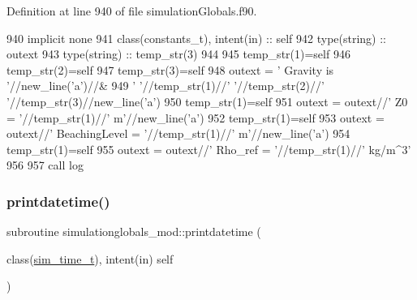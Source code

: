 Definition at line 940 of file simulation\+Globals.\+f90.


\begin{DoxyCode}
940     \textcolor{keywordtype}{implicit none}
941     \textcolor{keywordtype}{class}(constants\_t), \textcolor{keywordtype}{intent(in)} :: self
942     \textcolor{keywordtype}{type}(string) :: outext
943     \textcolor{keywordtype}{type}(string) :: temp\_str(3)
944 
945     temp\_str(1)=self%
946     temp\_str(2)=self%
947     temp\_str(3)=self%
948     outext = \textcolor{stringliteral}{'      Gravity is '}//new\_line(\textcolor{stringliteral}{'a'})//&
949         \textcolor{stringliteral}{'       '}//temp\_str(1)//\textcolor{stringliteral}{' '}//temp\_str(2)//\textcolor{stringliteral}{' '}//temp\_str(3)//new\_line(\textcolor{stringliteral}{'a'})
950     temp\_str(1)=self%
951     outext = outext//\textcolor{stringliteral}{'       Z0 = '}//temp\_str(1)//\textcolor{stringliteral}{' m'}//new\_line(\textcolor{stringliteral}{'a'})
952     temp\_str(1)=self%
953     outext = outext//\textcolor{stringliteral}{'       BeachingLevel = '}//temp\_str(1)//\textcolor{stringliteral}{' m'}//new\_line(\textcolor{stringliteral}{'a'})
954     temp\_str(1)=self%
955     outext = outext//\textcolor{stringliteral}{'       Rho\_ref = '}//temp\_str(1)//\textcolor{stringliteral}{' kg/m^3'}
956 
957     \textcolor{keyword}{call }log%
\end{DoxyCode}
\mbox{\label{namespacesimulationglobals__mod_abd0e28a5ec7733d0292dd8e631e96577}} 
\subsubsection{\texorpdfstring{printdatetime()}{printdatetime()}}
{\footnotesize\ttfamily subroutine simulationglobals\+\_\+mod\+::printdatetime (\begin{DoxyParamCaption}\item[{class(\mbox{\hyperlink{structsimulationglobals__mod_1_1sim__time__t}{sim\+\_\+time\+\_\+t}}), intent(in)}]{self }\end{DoxyParamCaption})\hspace{0.3cm}{\ttfamily [private]}}



